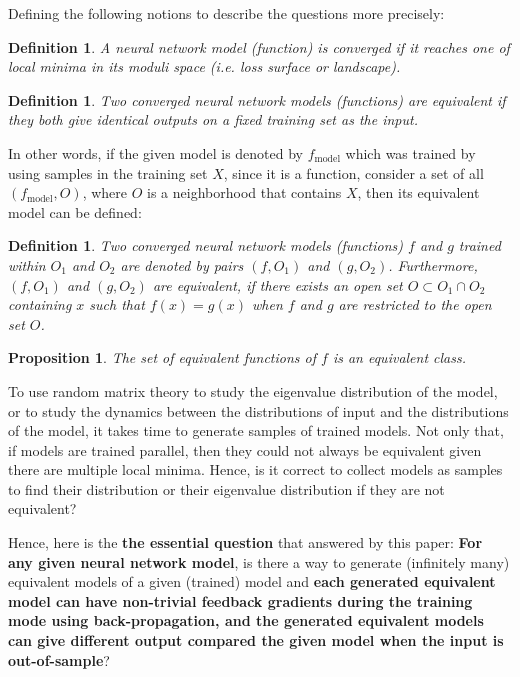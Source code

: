 \documentclass{article}
\theoremstyle{plain}
\theoremstyle{plain} %
\newtheorem{proposition}{Proposition}
\newtheorem{definition}[theorem]{Definition}
\theoremstyle{definition}  %
\theoremstyle{remark}  %
\theoremstyle{plain}
\begin{document}
Defining the following notions to describe the questions more precisely:
\begin{definition}
\textit{A neural network model (function) is converged} if it reaches one of local minima in its moduli space (i.e. loss surface or landscape).
\end{definition}

\begin{definition}
\textit{Two converged neural network models (functions) are equivalent} if they both give identical outputs on a fixed training set as the input.
\end{definition}

In other words, if the given model is denoted by $f_{\text{model}}$ which was trained by using samples in the training set $X$, since it is a function, consider a set of all $(f_{\text{model}},O)$, where $O$ is a neighborhood that contains $X$, then its equivalent model can be defined:
\begin{definition}
Two converged neural network models (functions) $f$ and $g$ trained within $O_1$ and $O_2$ are denoted by pairs $(f,O_1)$ and $(g,O_2)$. Furthermore, $(f,O_1)$ and $(g,O_2)$ are equivalent, if there exists an open set $O\subset O_1 \cap O_2$ containing $x$ such that $f(x)=g(x)$ when $f$ and $g$ are restricted to the open set $O$.
\end{definition}
\begin{proposition}\cite{tu2011manifolds}
The set of equivalent functions of $f$ is an equivalent class.
\end{proposition}


To use random matrix theory\cite{louart2018random, pennington2017geometry, seddik2020random} to study the eigenvalue distribution of the model, or to study the dynamics between the distributions of input and the distributions of the model, it takes time to generate samples of trained models. Not only that, if models are trained parallel, then they could not always be equivalent given there are multiple local minima. Hence, is it correct to collect models as samples to find their distribution or their eigenvalue distribution if they are not equivalent?

Hence, here is the \textbf{the essential question} that answered by this paper: \textbf{For any given neural network model}, is there a way to generate (infinitely many) equivalent models of a given (trained) model and \textbf{each generated equivalent model can have non-trivial feedback gradients during the training mode using back-propagation, and the generated equivalent models can give different output compared the given model when the input is out-of-sample}?
\end{document}
